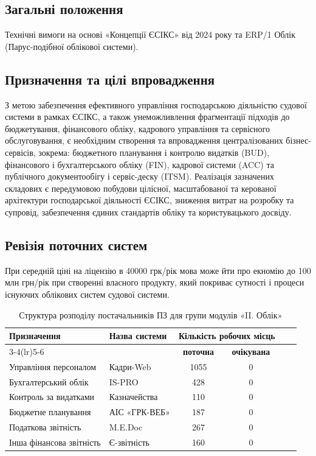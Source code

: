 \documentclass{article}
\begin{document}
\newpage
\subsection*{Загальні положення}

Технічні вимоги на основі «Концепції ЄСІКС» від 2024 року \cite{esiks} та ERP/1 Облік (Парус-подібної облікової системи).

\subsection*{Призначення та цілі впровадження}

З метою забезпечення ефективного управління господарською діяльністю судової системи в рамках ЄСІКС,
а також унеможливлення фрагментації підходів до бюджетування, фінансового обліку, кадрового управління
та сервісного обслуговування, є необхідним створення та впровадження централізованих бізнес-сервісів,
зокрема: бюджетного планування і контролю видатків (BUD), фінансового і бухгалтерського обліку (FIN),
кадрової системи (ACC) та публічного документообігу і сервіс-деску (ITSM).
Реалізація зазначених складових є передумовою побудови цілісної, масштабованої та керованої
архітектури господарської діяльності ЄСІКС, зниження витрат на розробку та супровід,
забезпечення єдиних стандартів обліку та користувацького досвіду.

\subsection*{Ревізія поточних систем}

При середній ціні на ліцензію в 40000 грк/рік мова може йти про екномію до 100 млн грн/рік при створенні
власного продукту, який покриває сутності і процеси існуючих облікових систем судової системи.

\begin{table}[htbp]
\centering
\caption{Структура розподілу постачальників ПЗ для групи модулів «II. Облік»}
\label{tab:oblik-suppliers}
\begin{tabular}{p{5.2cm} p{3.8cm} *{4}{c}}
\toprule
\textbf{Призначення} 
& \textbf{Назва системи} 
& \multicolumn{2}{c}{\textbf{Кількість робочих місць}} 
 \\
\cmidrule(lr){3-4}\cmidrule(lr){5-6}
& & \textbf{поточна} & \textbf{очікувана}  \\
\midrule
Управління персоналом 
& Кадри-Web 
& 1055 & 0 \\
Бухгалтерський облік 
& IS-PRO 
& 428 & 0 \\
Контроль за видатками 
& Казначейства 
& 110 & 0 \\
Бюджетне планування 
& АІС «ГРК-ВЕБ» 
& 187 & 0 \\
Податкова звітність 
& M.E.Doc 
& 267 & 0 \\
Інша фінансова звітність 
& Є-звітність 
& 160 & 0 \\
\bottomrule
\end{tabular}
\end{table}
\end{document}
